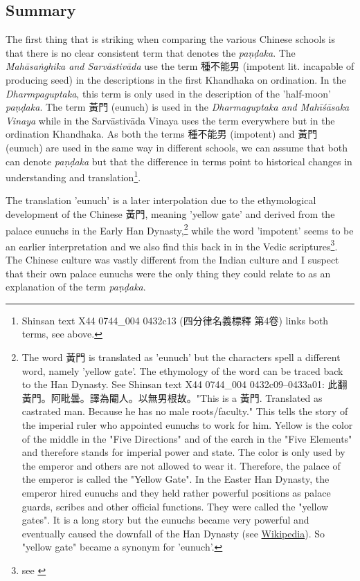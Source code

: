 \subsection{Summary}
The first thing that is striking when comparing the various Chinese schools is that there is no clear consistent term that denotes the {\em paṇḍaka}. The {\em Mahāsaṅghika and Sarvāstivāda} use the term 種不能男 (impotent lit. incapable of producing seed) in the descriptions in the first Khandhaka on ordination. In the {\em Dharmpaguptaka}, this term is only used in the description of the 'half-moon' {\em paṇḍaka}. The term 黃門 (eunuch) is used in the {\em Dharmaguptaka and Mahīśāsaka Vinaya} while in the Sarvāstivāda Vinaya uses the term everywhere but in the ordination Khandhaka. As both the terms 種不能男 (impotent) and 黃門 (eunuch) are used in the same way in different schools, we can assume that both can denote {\em paṇḍaka} but that the difference in terms point to historical changes in understanding and translation\footnote{Shinsan text X44 0744_004 0432c13 (四分律名義標釋 第4卷) links both terms, see above.}.

The translation 'eunuch' is a later interpolation due to the ethymological development of the Chinese 黃門, meaning 'yellow gate' and derived from the palace eunuchs in the Early Han Dynasty,\footnote{The word 黃門 is translated as 'eunuch' but the characters spell a different word, namely 'yellow gate'. The ethymology of the word can be traced back to the Han Dynasty. See Shinsan text X44 0744_004 0432c09–0433a01: 此翻黃門。阿毗曇。譯為閹人。以無男根故。"This is a 黃門. Translated as castrated man. Because he has no male roots/faculty." This tells the story of the imperial ruler who appointed eunuchs to work for him. Yellow is the color of the middle in the "Five Directions" and of the earch in the "Five Elements" and therefore stands for imperial power and state. The color is only used by the emperor and others are not allowed to wear it. Therefore, the palace of the emperor is called the "Yellow Gate". In the Easter Han Dynasty, the emperor hired eunuchs and they held rather powerful positions as palace guards, scribes and other official functions. They were called the "yellow gates". It is a long story but the eunuchs became very powerful and eventually caused the downfall of the Han Dynasty (see \href{https://en.wikipedia.org/wiki/Han_dynasty}{Wikipedia}). So "yellow gate" became a synonym for 'eunuch'.} while the word 'impotent' seems to be an earlier interpretation and we also find this back in in the Vedic scriptures\footnote{see \cite{zwilling}}. The Chinese culture was vastly different from the Indian culture and I suspect that their own palace eunuchs were the only thing they could relate to as an explanation of the term {\em paṇḍaka}.

